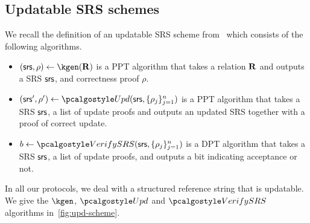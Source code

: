 

\newcommand*{\Scale}[2][4]{\scalebox{#1}{$#2$}}%



\subsection{Updatable SRS schemes}\label{def:upd-scheme}

We recall the definition of an updatable SRS scheme from~\cite{C:GKMMM18} which consists of the following algorithms.
\vspace{-8pt}
\begin{itemize} 
	\item
	$(\srs,\rho) \gets \kgen(\REL)$ is a PPT algorithm that takes a relation $\mathbf{R}$ and outputs a SRS $\mathsf{srs}$, and correctness proof $\rho$.
	\item
	$ (\srs',\rho') \gets \upd(\srs, \{\rho_j \}_{j=1}^n)$ is a PPT algorithm that takes a SRS $\mathsf{srs}$, a list of update proofs and outputs an updated SRS together with a proof of correct update. 
	\item
	$b \gets \verifyCRS(\srs, \{\rho_j \}_{j=1}^n)$ is a DPT algorithm that takes a SRS $\mathsf{srs}$, a list of update proofs, and outputs a bit indicating acceptance or not.
\end{itemize}

	In all our protocols, we deal with a structured reference string that is updatable. We give the $\kgen$, $\upd$ and $\verifyCRS$ algorithms in~\cref{fig:upd-scheme}.
	
